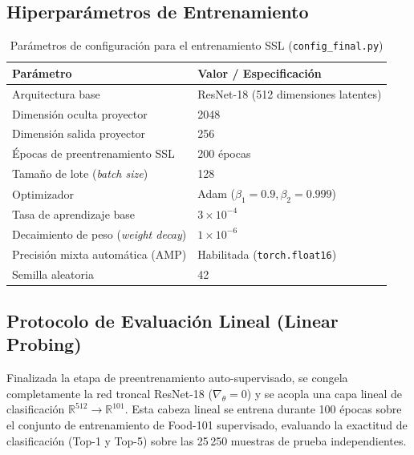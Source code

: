 \subsection{Hiperparámetros de Entrenamiento}
\begin{table}[ht]
\centering
\caption{Parámetros de configuración para el entrenamiento SSL (\texttt{config\_final.py})}
\label{tab:hyperparams}
\begin{tabular}{ll}
\toprule
\textbf{Parámetro} & \textbf{Valor / Especificación} \\
\midrule
Arquitectura base & ResNet-18 (512 dimensiones latentes) \\
Dimensión oculta proyector & 2048 \\
Dimensión salida proyector & 256 \\
Épocas de preentrenamiento SSL & 200 épocas \\
Tamaño de lote (\textit{batch size}) & 128 \\
Optimizador & Adam ($\beta_1 = 0.9, \beta_2 = 0.999$) \\
Tasa de aprendizaje base & $3 \times 10^{-4}$ \\
Decaimiento de peso (\textit{weight decay}) & $1 \times 10^{-6}$ \\
Precisión mixta automática (AMP) & Habilitada (\texttt{torch.float16}) \\
Semilla aleatoria & 42 \\
\bottomrule
\end{tabular}
\end{table}

\subsection{Protocolo de Evaluación Lineal (Linear Probing)}
Finalizada la etapa de preentrenamiento auto-supervisado, se congela completamente la red troncal ResNet-18 ($\nabla_\theta = 0$) y se acopla una capa lineal de clasificación $\mathbb{R}^{512} \to \mathbb{R}^{101}$. Esta cabeza lineal se entrena durante 100 épocas sobre el conjunto de entrenamiento de Food-101 supervisado, evaluando la exactitud de clasificación (Top-1 y Top-5) sobre las 25\,250 muestras de prueba independientes.

